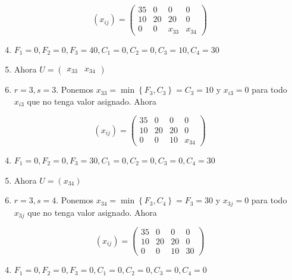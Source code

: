 \documentclass[10pt]{article}
\begin{document}
$$
\left(x_{i j}\right)=\left(\begin{array}{cccc}
35 & 0 & 0 & 0 \\
10 & 20 & 20 & 0 \\
0 & 0 & x_{33} & x_{34}
\end{array}\right)
$$

\begin{enumerate}
  \setcounter{enumi}{3}
  \item $F_{1}=0, F_{2}=0, F_{3}=40, C_{1}=0, C_{2}=0, C_{3}=10, C_{4}=30$
  \item Ahora $U=\left(\begin{array}{ll}x_{33} & x_{34}\end{array}\right)$
  \item $r=3, s=3$. Ponemos $x_{33}=\min \left\{F_{3}, C_{3}\right\}=C_{3}=10$ y $x_{i 3}=0$ para todo $x_{i 3}$ que no tenga valor asignado. Ahora
\end{enumerate}

$$
\left(x_{i j}\right)=\left(\begin{array}{cccc}
35 & 0 & 0 & 0 \\
10 & 20 & 20 & 0 \\
0 & 0 & 10 & x_{34}
\end{array}\right)
$$

\begin{enumerate}
  \setcounter{enumi}{3}
  \item $F_{1}=0, F_{2}=0, F_{3}=30, C_{1}=0, C_{2}=0, C_{3}=0, C_{4}=30$
  \item Ahora $U=\left(x_{34}\right)$
  \item $r=3, s=4$. Ponemos $x_{34}=\min \left\{F_{3}, C_{4}\right\}=F_{3}=30$ y $x_{3 j}=0$ para todo $x_{3 j}$ que no tenga valor asignado. Ahora
\end{enumerate}

$$
\left(x_{i j}\right)=\left(\begin{array}{cccc}
35 & 0 & 0 & 0 \\
10 & 20 & 20 & 0 \\
0 & 0 & 10 & 30
\end{array}\right)
$$

\begin{enumerate}
  \setcounter{enumi}{3}
  \item $F_{1}=0, F_{2}=0, F_{3}=0, C_{1}=0, C_{2}=0, C_{3}=0, C_{4}=0$
\end{enumerate}
\end{document}
